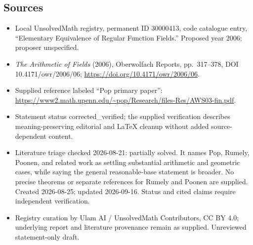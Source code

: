 \documentclass[11pt]{article}
\begin{document}
\subsection{Sources}
\begin{itemize}
\item Local UnsolvedMath registry, permanent ID 30000413, code catalogue entry, ``Elementary Equivalence of Regular Function Fields.'' Proposed year 2006; proposer unspecified.
\item \emph{The Arithmetic of Fields} (2006), Oberwolfach Reports, pp.\ 317--378, DOI 10.4171/owr/2006/06; \url{https://doi.org/10.4171/owr/2006/06}.
\item Supplied reference labeled ``Pop primary paper'': \url{https://www2.math.upenn.edu/~pop/Research/files-Res/AWS03-fin.pdf}.
\item Statement status corrected\_verified; the supplied verification describes meaning-preserving editorial and LaTeX cleanup without added source-dependent content.
\item Literature triage checked 2026-08-21: partially solved. It names Pop, Rumely, Poonen, and related work as settling substantial arithmetic and geometric cases, while saying the general reasonable-base statement is broader. No precise theorems or separate references for Rumely and Poonen are supplied. Created 2026-08-25; updated 2026-09-16. Status and cited claims require independent verification.
\item Registry curation by Ulam AI / UnsolvedMath Contributors, CC BY 4.0; underlying report and literature provenance remain as supplied. Unreviewed statement-only draft.
\end{itemize}
\end{document}
